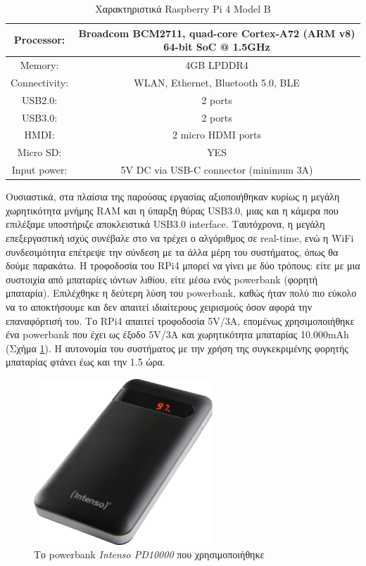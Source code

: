 \begin{table}[H]
    \centering
    \begin{tabular}{|c|c|}
        \hline
        Processor: & Broadcom BCM2711, quad-core Cortex-A72 (ARM v8)
64-bit SoC @ 1.5GHz\\
        \hline
        Memory: & 4GB LPDDR4\\
        \hline
        Connectivity: & WLAN, Ethernet, Bluetooth 5.0, BLE\\
        \hline
        USB2.0: & 2 ports\\
        \hline
        USB3.0: & 2 ports\\
        \hline
        HMDI: & 2 micro HDMI ports\\
        \hline
        Micro SD: & YES\\
        \hline
        Input power: & 5V DC via USB-C connector (minimum 3A)\\
        \hline
    \end{tabular}
    \caption{Χαρακτηριστικά Raspberry Pi 4 Model B \cite{BuyaRasp17:online}}
    \label{tab:raspberry}
\end{table}

Ουσιαστικά, στα πλαίσια της παρούσας εργασίας αξιοποιήθηκαν κυρίως η μεγάλη χωρητικότητα μνήμης RAM και η ύπαρξη θύρας USB3.0, μιας και η κάμερα που επιλέξαμε υποστήριζε αποκλειστικά USB3.0 interface. Ταυτόχρονα, η μεγάλη επεξεργαστική ισχύς συνέβαλε στο να τρέχει ο αλγόριθμος σε real-time, ενώ η WiFi συνδεσιμότητα επέτρεψε την σύνδεση με τα άλλα μέρη του συστήματος, όπως θα δούμε παρακάτω. Η τροφοδοσία του RPi4 μπορεί να γίνει με δύο τρόπους: είτε με μια συστοιχία από μπαταρίες ιόντων λιθίου, είτε μέσω ενός powerbank (φορητή μπαταρία). Επιλέχθηκε η δεύτερη λύση του powerbank, καθώς ήταν πολύ πιο εύκολο να το αποκτήσουμε και δεν απαιτεί ιδιαίτερους χειρισμούς όσον αφορά την επαναφόρτισή του. Το RPi4 απαιτεί τροφοδοσία 5V/3A, επομένως χρησιμοποιήθηκε ένα powerbank που έχει ως έξοδο 5V/3A και χωρητικότητα μπαταρίας 10.000mAh (Σχήμα \ref{fig:powerbank}). Η αυτονομία του συστήματος με την χρήση της συγκεκριμένης φορητής μπαταρίας φτάνει έως και την 1.5 ώρα.

\begin{figure}[H]
    \centering
    \includegraphics[width=0.6\textwidth]{images/powerbank.png}
    \caption{Το powerbank \emph{Intenso PD10000} που χρησιμοποιήθηκε}
    \label{fig:powerbank}
\end{figure}

